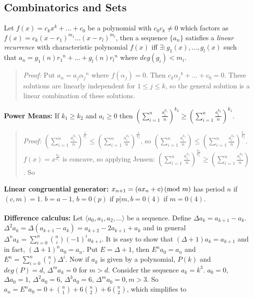 \subsection{Combinatorics and Sets}
Let $f(x)= c_k x^k + \ldots + c_0$ be a polynomial
with $c_0 c_k \ne 0$ which factors as
$f(x)= c_k {(x- r_1 )}^{m_1} \ldots {(x- r_l )}^{m_l}$, then a sequence
$\{a_n \}$ satisfies a \emph{linear recurrence} with characteristic polynomial
$f(x)$ iff $\exists : g_1 (x) , \ldots , g_l (x)$ such that
$a_n = g_1 (n) {r_1}^n + \ldots + g_l (n) {r_l}^n$ where
$deg(g_{i})<m_{i}$.
\begin{quote}
\emph{Proof:} Put $a_n = a_j {\alpha_j}^n$ where $f(\alpha_j)=0$.
Then $c_k {\alpha_j}^k + \ldots + c_0 = 0$.  These solutions are linearly independent for $1 \leq j \leq k$, so the general solution
is a linear combination of these solutions.
\end{quote}
{\bf Power Means:}  If $k_1 \geq k_2$ and $a_i \geq 0$ then 
$ (\sum_{i=1}^n {\frac {a_i^{k_1}} {n}})^{k_2} \geq (\sum_{i=1}^n {\frac {a_i^{k_2}} {n}})^{k_1} $.
\begin{quote}
\emph{Proof:}
$(\sum_{i=1}^n {\frac {a_i^{k_1}} n})^{\frac 1 {k_1}} \leq (\sum_{i=1}^n {\frac {a_i^{k_2}} n})^{\frac 1 {k_2}}$,
so $(\sum_{i=1}^n {\frac {a_i^{k_1}} n})\leq (\sum_{i=1}^n {\frac {a_i^{k_2}} n})^{\frac {k_1} {k_2}}$.
$f(x) = x^{\frac {k_2} {k_1}}$ is concave, so applying Jensen:
$(\sum_{i=1}^n {\frac {a_i^{k_1}} n})^{\frac {k_2} {k_1}} \geq (\sum_{i=1}^n {\frac {a_i^{k_2}} n})$. So
\end{quote}
{\bf Linear congruential generator:}
$x_{n+1} = (a x_{n} + c) \thinspace \textnormal{(mod } m \textnormal{)}$
has period $n$ if $(c,m)=1$.  $b=a-1$, $b=0 (p)$ if $p|m, b=0 (4)$
if $m=0 (4)$.
\\
\\
{\bf Difference calculus:} Let $\langle a_0, a_1, a_2, \ldots \rangle$ be a sequence.  Define $\Delta a_k = a_{k+1} - a_k$.
$\Delta^2 a_k = \Delta (a_{k+1} - a_k) = a_{k+2} - 2a_{k+1} + a_k$ and in general
$\Delta^n a_k = \sum_{i=0}^n {n \choose i} (-1)^i a_{k+i}$.  It is easy to show that $(\Delta + 1) a_k = a_{k+1}$ and in
fact, $(\Delta + 1)^n a_0 = a_{n}$.  
Put $E= \Delta + 1$, then $E^n a_0 = a_n$ and $E^n= \sum_{i=0}^n {n \choose i} \Delta^{i}$. Now if $a_k$ is given by
a polynomial, $P(k)$ and $deg(P) = d$, $\Delta^m a_k = 0$ for $m > d$.  Consider the sequence $a_k= k^3$.
$a_0 = 0$, $\Delta a_0 = 1$, $\Delta^2 a_0 = 6$, $\Delta^3 a_0 = 6$, $\Delta^m a_0 = 0, m > 3$.
So $a_n = E^n a_0 = 0 + {n \choose 1} + 6 {n \choose 2} + 6 {n \choose 2}$, which simplifies to
